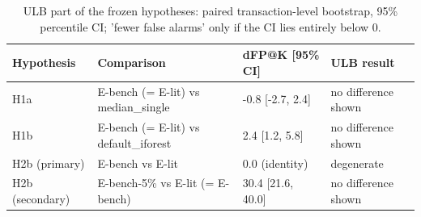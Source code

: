 \begin{table}[t]
\centering
\small
\caption{ULB part of the frozen hypotheses: paired transaction-level bootstrap, 95\% percentile CI; 'fewer false alarms' only if the CI lies entirely below 0.}
\label{tab:e3-ulb-hypotheses}
\begin{tabular}{llll}
\toprule
Hypothesis & Comparison & dFP@K [95\% CI] & ULB result \\
\midrule
H1a & E-bench (= E-lit) vs median\_single & -0.8 [-2.7, 2.4] & no difference shown \\
H1b & E-bench (= E-lit) vs default\_iforest & 2.4 [1.2, 5.8] & no difference shown \\
H2b (primary) & E-bench vs E-lit & 0.0 (identity) & degenerate \\
H2b (secondary) & E-bench-5\% vs E-lit (= E-bench) & 30.4 [21.6, 40.0] & no difference shown \\
\bottomrule
\end{tabular}
\end{table}
